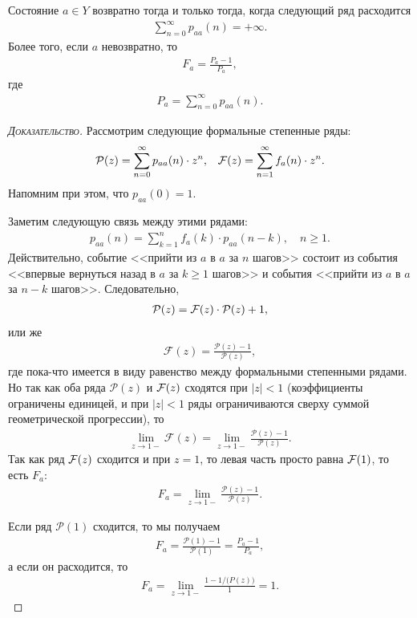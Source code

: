 \documentclass[../main.tex]{subfiles}
\begin{document}
\begin{thm}
 \label{theorem:back_criteria}
 Состояние $ a \in Y $  возвратно тогда и только тогда, когда следующий ряд расходится
 \begin{align*}
  \sum_{n=0}^{\infty} p_{aa}(n) = +\infty.
 \end{align*} Более того, если $ a $  невозвратно, то
 \begin{align}
  \label{eq:back_criteria:F_a}
  F_a = \frac{P_a - 1}{P_a},
 \end{align} где
 \begin{align*}
  P_a = \sum_{n=0}^{\infty} p_{aa}(n).
 \end{align*}
\end{thm}
\begin{proof}[\normalfont\textsc{Доказательство}]
 Рассмотрим следующие формальные степенные ряды:
 \begin{align*}
  \mathcal P(z) = \sum_{n=0}^{\infty} p_{aa}(n) \cdot z^{n}, && \mathcal F(z) = \sum_{n=1}^{\infty}f_a(n) \cdot z^{n}.
 \end{align*} Напомним при этом, что $ p_{aa}(0) = 1 $.

 Заметим следующую связь между этими рядами:
 \begin{align*}
  p_{aa}(n) = \sum_{k=1}^{n} f_a(k) \cdot p_{aa}(n-k), \quad n \geqslant 1.
 \end{align*} Действительно, событие <<прийти из $ a $ в $ a $ за $ n $ шагов>> состоит из события <<впервые вернуться назад в $ a $ за $ k \geqslant 1 $ шагов>> и события <<прийти из $ a $ в $ a $ за $ n-k $ шагов>>. Следовательно,
 \begin{align*}
  \mathcal P(z) = \mathcal F(z) \cdot \mathcal P(z) + 1,
 \end{align*} или же
 \begin{align*}
  \mathcal F(z) = \frac{\mathcal P(z)-1}{\mathcal P(z)},
 \end{align*} где пока-что имеется в виду равенство между формальными степенными рядами. Но так как оба ряда $ \mathcal P(z) $ и $ \mathcal F(z) $ сходятся при $ \left| z \right| < 1 $ (коэффициенты ограничены единицей, и при $ \left| z \right| < 1 $ ряды ограничиваются сверху суммой геометрической прогрессии), то
 \begin{align*}
  \lim_{z \to 1-}  \mathcal F(z) = \lim_{z \to 1-} \frac{\mathcal P(z) -1}{\mathcal P(z)}.
 \end{align*} Так как ряд $ \mathcal F(z) $ сходится и при  $ z = 1 $, то левая часть просто равна  $ \mathcal F(1) $, то есть  $ F_a $:
 \begin{align*}
  F_a = \lim_{z \to 1-} \frac{\mathcal P(z) - 1}{\mathcal P(z)}.
 \end{align*}

 Если ряд $ \mathcal P(1) $ сходится, то мы получаем
 \begin{align*}
  F_a = \frac{\mathcal P(1) - 1}{\mathcal P(1)} = \frac{P_a - 1}{P_a},
 \end{align*} а если он расходится, то
 \begin{align*}
  F_a = \lim_{z \to 1-} \frac{1 - 1 / \mathcal(P(z))}{1} = 1.
 \end{align*}
\end{proof}
\end{document}
